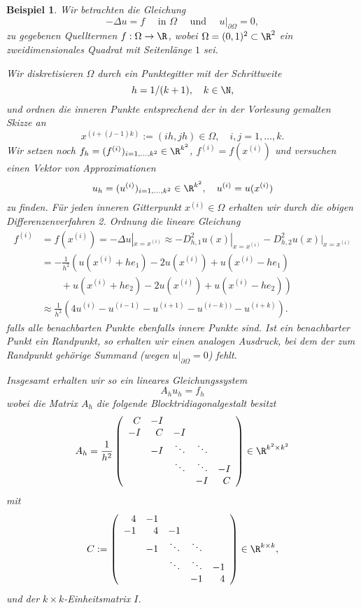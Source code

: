 \documentclass[
]{mycourse}
\theoremstyle{mythm}
\newtheorem{beispiel}[theorem]{Beispiel}
\theoremstyle{break}
\begin{document}
\begin{beispiel}\label{bsp:poisson}
Wir betrachten die Gleichung
\[
-\Delta u=f \quad \mbox{ in $\Omega$} \quad \mbox{ und } \quad u|_{\partial \Omega}=0,
\]
zu gegebenen Quelltermen $f:\Omega \to \R$, wobei $\Omega=(0,1)^2\subset \R^2$ ein zweidimensionales Quadrat mit Seitenlänge $1$ sei.

Wir diskretisieren $\Omega$ durch ein Punktegitter mit der Schrittweite 
 \[
h=1/(k+1),\quad k\in \N,
\]
und ordnen 
die inneren Punkte entsprechend der in der Vorlesung gemalten Skizze an
\[
x^{(i+(j-1)k)}:=(ih,jh)\in \Omega, \quad i,j=1,\ldots,k.
\]
Wir setzen noch $f_h=(f^{(i)})_{i=1,\ldots,k^2}\in \R^{k^2}$, $f^{(i)}=f(x^{(i)})$ und versuchen einen
Vektor von Approximationen 
\[
u_h=(u^{(i)})_{i=1,\ldots,k^2}\in \R^{k^2}, \quad u^{(i)}=u(x^{(i)})
\]
zu finden. Für jeden inneren Gitterpunkt $x^{(i)}\in \Omega$ erhalten wir durch die obigen Differenzenverfahren 2. Ordnung
die lineare Gleichung
\begin{align*}
f^{(i)}&=f(x^{(i)})=- \Delta u|_{x=x^{(i)}}\approx - D_{h,1}^2 u(x)|_{x=x^{(i)}} - D_{h,2}^2 u(x)|_{x=x^{(i)}}\\
&= -\frac{1}{h^2}\left( u(x^{(i)} + he_1)-2u(x^{(i)})+u(x^{(i)}-he_1) \right.\\
& \qquad \left. {} + u(x^{(i)} + he_2)-2u(x^{(i)})+u(x^{(i)}-he_2)\right)\\
&\approx \frac{1}{h^2} \left( 4 u^{(i)} - u^{(i-1)} - u^{(i+1)} -  u^{(i-k))} - u^{(i+k)} \right).
\end{align*}
falls alle benachbarten Punkte ebenfalls innere Punkte sind. Ist ein benachbarter Punkt ein Randpunkt, so erhalten
wir einen analogen Ausdruck, bei dem der zum Randpunkt gehörige Summand (wegen $u|_{\partial \Omega}=0$) fehlt.

Insgesamt erhalten wir so ein lineares Gleichungssystem
\[
A_h u_h = f_h
\]
wobei die Matrix $A_h$ die folgende Blocktridiagonalgestalt besitzt
\[
A_h=\frac{1}{h^2}\left( \begin{array}{r r r r r} C & -I\\ -I & C & -I\\ & -I & \ddots & \ddots\\ & & \ddots & \ddots & -I\\ & & & -I & C\end{array}\right)\in \R^{k^2\times k^2}
\]
mit
\[
C:=\left( \begin{array}{r r r r r} 4 & -1\\ -1 & 4 & -1\\ & -1 & \ddots & \ddots\\ & & \ddots & \ddots & -1\\ & & & -1 & 4\end{array}\right)\in \R^{k\times k},
\]
und der $k\times k$-Einheitsmatrix $I$.
\end{beispiel}
\end{document}
